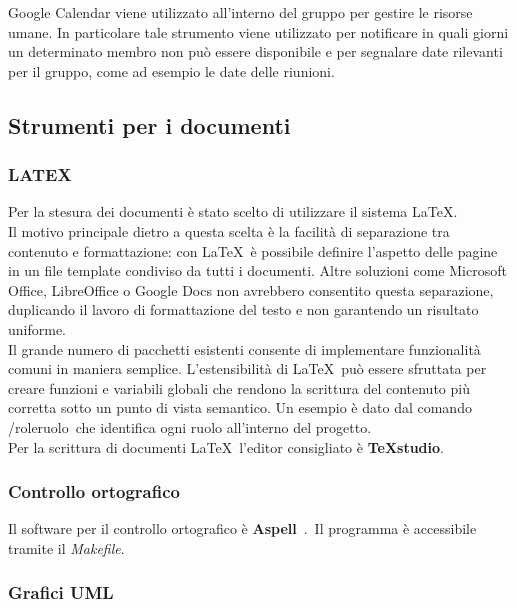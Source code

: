 Google Calendar viene utilizzato all’interno del gruppo per gestire le risorse umane. In
particolare tale strumento viene utilizzato per notificare in quali giorni un determinato
membro non può essere disponibile e per segnalare date rilevanti per il gruppo, come
ad esempio le date delle riunioni.



\subsection{Strumenti per i documenti}
\subsubsection{LATEX} 
 
Per la stesura dei documenti è stato scelto di utilizzare il sistema \LaTeX.\\
Il motivo 
principale dietro a questa scelta è la facilità di separazione tra contenuto e formattazione: 
con \LaTeX\ è possibile definire l’aspetto delle pagine in un file template condiviso da tutti i documenti. Altre soluzioni come Microsoft Office, LibreOffice o Google Docs non 
avrebbero consentito questa separazione, duplicando il lavoro di formattazione del testo 
e non garantendo un risultato uniforme.\\
Il grande numero di pacchetti esistenti consente di implementare funzionalità comuni 
in maniera semplice. L’estensibilità di \LaTeX\ può essere sfruttata per creare funzioni e 
variabili globali che rendono la scrittura del contenuto più corretta sotto un punto di 
vista semantico. Un esempio è dato dal comando /role\textbraceleft ruolo\textbraceright\ che identifica ogni ruolo 
all’interno del progetto.\\
Per la scrittura di documenti \LaTeX\  l’editor consigliato è \textbf{TeXstudio}. 

\subsubsection{Controllo ortografico}

Il software per il controllo ortografico è \textbf{Aspell}\ .\ Il programma è accessibile tramite il \emph{Makefile}.


\subsubsection{Grafici UML} 

